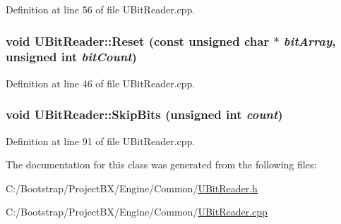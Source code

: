 Definition at line 56 of file UBitReader.cpp.\hypertarget{class_u_bit_reader_bfd4df4797cd828c904ae5fff3153499}{
\subsubsection[{Reset}]{\setlength{\rightskip}{0pt plus 5cm}void UBitReader::Reset (const unsigned char $\ast$ {\em bitArray}, \/  unsigned int {\em bitCount})}}
\label{class_u_bit_reader_bfd4df4797cd828c904ae5fff3153499}




Definition at line 46 of file UBitReader.cpp.\hypertarget{class_u_bit_reader_1d593ed1bb42821586c7ab7f82cabca6}{
\subsubsection[{SkipBits}]{\setlength{\rightskip}{0pt plus 5cm}void UBitReader::SkipBits (unsigned int {\em count})}}
\label{class_u_bit_reader_1d593ed1bb42821586c7ab7f82cabca6}




Definition at line 91 of file UBitReader.cpp.

The documentation for this class was generated from the following files:\begin{CompactItemize}
\item 
C:/Bootstrap/ProjectBX/Engine/Common/\hyperlink{_u_bit_reader_8h}{UBitReader.h}\item 
C:/Bootstrap/ProjectBX/Engine/Common/\hyperlink{_u_bit_reader_8cpp}{UBitReader.cpp}\end{CompactItemize}
